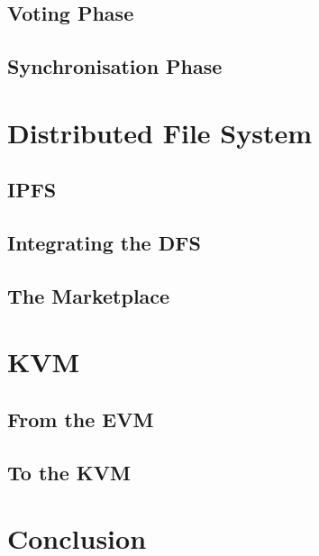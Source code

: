 \documentclass{article}
\begin{document}



\subsection{Voting Phase}



\subsection{Synchronisation Phase}




\section{Distributed File System}



\subsection{IPFS}



\subsection{Integrating the DFS}



\subsection{The Marketplace}




\section{KVM}



\subsection{From the EVM}



\subsection{To the KVM}




\section*{Conclusion}






\end{document}
